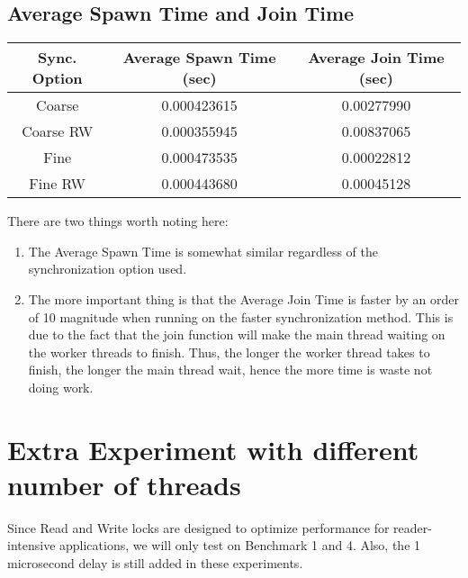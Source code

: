 \documentclass[11pt]{article}
\begin{document}
\subsection{Average Spawn Time and Join Time}
\begin{table}[H]
	\centering
	\begin{tabular}{|c|c|c|}
		\hline
		Sync. Option &Average Spawn Time (sec)	&Average Join Time (sec)	\\
		\hline
		Coarse &0.000423615	&0.00277990\\
		\hline
		Coarse RW	&0.000355945	&0.00837065\\
		\hline
		Fine	&0.000473535	&0.00022812\\
		\hline
		Fine RW	&0.000443680	&0.00045128\\
		\hline
	\end{tabular}
\end{table}
There are two things worth noting here:
\begin{enumerate}
	\item The Average Spawn Time is somewhat similar regardless of the synchronization option used.
	\item The more important thing is that the Average Join Time is faster by an order of 10 magnitude when running on the faster synchronization method. This is due to the fact that the join function will make the main thread waiting on the worker threads to finish. Thus, the longer the worker thread takes to finish, the longer the main thread wait, hence the more time is waste not doing work.
\end{enumerate}
\section{Extra Experiment with different number of threads}
Since Read and Write locks are designed to optimize performance for reader-intensive applications, we will only test on Benchmark 1 and 4. Also, the 1 microsecond delay is still added in these experiments.
\end{document}
